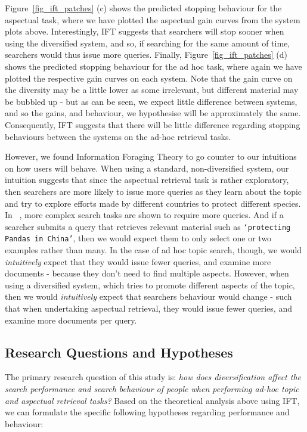 Figure~\ref{fig_ift_patches} (c) shows the predicted stopping behaviour for the aspectual task, where we have plotted the aspectual gain curves from the system plots above. Interestingly, IFT suggests that searchers will stop sooner when using the diversified system, and so, if searching for the same amount of time, searchers would thus issue more queries. Finally, Figure~\ref{fig_ift_patches} (d) shows the predicted stopping behaviour for the ad hoc task, where again we have plotted the respective gain curves on each system. Note that the gain curve on the diversity may be a little lower as some irrelevant, but different material may be bubbled up - but as can be seen, we expect little difference between systems, and so the gains, and behaviour, we hypothesise will be approximately the same. Consequently, IFT suggests that there will be little difference regarding stopping behaviours between the systems on the ad-hoc retrieval tasks.

However, we found Information Foraging Theory to go counter to our intuitions on how users will behave. 
When using a standard, non-diversified system, our intuition suggests that since the aspectual retrieval task is rather exploratory, then searchers are more likely to issue more queries as they learn about the topic and try to explore efforts made by different countries to protect different species. In ~\cite{kelly2015search_tasks}, more complex search tasks are shown to require more queries. And if a searcher submits a query that retrieves relevant material such as \texttt{`protecting Pandas in China'}, then we would expect them to only select one or two examples rather than many. In the case of ad hoc topic search, though, we would \emph{intuitively} expect that they would issue fewer queries, and examine more documents - because they don't need to find multiple aspects. However, when using a diversified system, which tries to promote different aspects of the topic, then we would \emph{intuitively} expect that searchers behaviour would change - such that when undertaking aspectual retrieval, they would issue fewer queries, and examine more documents per query. 

\subsection{Research Questions and Hypotheses} \label{sec:questions}
The primary research question of this study is: {\it how does diversification affect the search performance and search behaviour of people when performing ad-hoc topic and aspectual retrieval tasks?} Based on the theoretical analysis above using IFT, we can formulate the specific following hypotheses regarding performance and behaviour:

